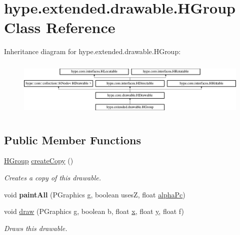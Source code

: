 \hypertarget{classhype_1_1extended_1_1drawable_1_1_h_group}{\section{hype.\-extended.\-drawable.\-H\-Group Class Reference}
\label{classhype_1_1extended_1_1drawable_1_1_h_group}
}
Inheritance diagram for hype.\-extended.\-drawable.\-H\-Group\-:\begin{figure}[H]
\begin{center}
\leavevmode
\includegraphics[height=2.745098cm]{classhype_1_1extended_1_1drawable_1_1_h_group}
\end{center}
\end{figure}
\subsection*{Public Member Functions}
\begin{DoxyCompactItemize}
\item 
\hyperlink{classhype_1_1extended_1_1drawable_1_1_h_group}{H\-Group} \hyperlink{classhype_1_1extended_1_1drawable_1_1_h_group_a39529ba2b7c9218e0d4dc1ab3aa6d8e4}{create\-Copy} ()
\begin{DoxyCompactList}\small\item\em Creates a copy of this drawable. \end{DoxyCompactList}\item 
\hypertarget{classhype_1_1extended_1_1drawable_1_1_h_group_a1a126a5752a33381c1e6cd1cb7a4d4e2}{void {\bfseries paint\-All} (P\-Graphics g, boolean uses\-Z, float \hyperlink{classhype_1_1core_1_1drawable_1_1_h_drawable_ab71ad420ba6d4a5eb981296684033d74}{alpha\-Pc})}\label{classhype_1_1extended_1_1drawable_1_1_h_group_a1a126a5752a33381c1e6cd1cb7a4d4e2}

\item 
void \hyperlink{classhype_1_1extended_1_1drawable_1_1_h_group_ae82ac3e36ac85034812148f8c821afcf}{draw} (P\-Graphics g, boolean b, float \hyperlink{classhype_1_1core_1_1drawable_1_1_h_drawable_aecdbc8b9aa2e41f7e19d2b12f3f0d36e}{x}, float \hyperlink{classhype_1_1core_1_1drawable_1_1_h_drawable_ac7bcfc7a213f2b55cf8d0a6cd647442a}{y}, float f)
\begin{DoxyCompactList}\small\item\em Draws this drawable. \end{DoxyCompactList}\end{DoxyCompactItemize}
